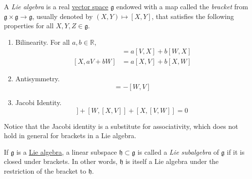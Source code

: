 \documentclass{article}
\newcounter{definition}[section]
\begin{document}
    \begin{definition}
      \label{def:lie-algebra}
      A \textit{Lie algebra} is a real \hyperref[lin-def:vector-space]{vector space} $\mathfrak{g}$ endowed with a map called the \textit{bracket} from $\mathfrak{g} \times \mathfrak{g} \to \mathfrak{g}$, usually denoted by $(X, Y) \mapsto [X, Y]$, that satisfies the following properties for all $X, Y, Z \in \mathfrak{g}$. 

      \begin{enumerate}
        \item Bilinearity. For all $a, b \in \mathbb{R}$, 
        \begin{align*}
          [a V + b W, X] & = a [V, X] + b [W, X] \\
          [X, a V + b W] & = a [X, V] + b [X, W]
        \end{align*}

        \item Antisymmetry.
        \begin{equation}
          [V, W] = - [W, V]
        \end{equation}

        \item Jacobi Identity. 
        \begin{equation}
          [V,[W,X]] + [W,[X,V]] + [X,[V,W]] = 0
        \end{equation}
      \end{enumerate}

      Notice that the Jacobi identity is a substitute for associativity, which does not hold in general for brackets in a Lie algebra. 
    \end{definition}

    \begin{definition}
      \label{def:lie-subalgebra}
      If $\mathfrak{g}$ is a \hyperref[def:lie-algebra]{Lie algebra}, a linear subspace $\mathfrak{h} \subset \mathfrak{g}$ is called a \textit{Lie subalgebra} of $\mathfrak{g}$ if it is closed under brackets. In other words, $\mathfrak{h}$ is itself a Lie algebra under the restriction of the bracket to $\mathfrak{h}$. 
    \end{definition}
\end{document}
